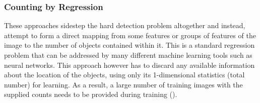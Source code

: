 \subsubsection{Counting by Regression}
These approaches sidestep the hard detection problem altogether and instead, attempt to form a direct mapping from some features or groups of features of the image to the number of objects contained within it. This is a standard regression problem that can be addressed by many different machine learning tools such as neural networks. This approach however has to discard any available information about the location of the objects, using only its 1-dimensional statistics (total number) for learning. As a result, a large number of training images with the supplied counts needs to be provided during training (\cite{REF18}).


\bigskip

\goodbreak

